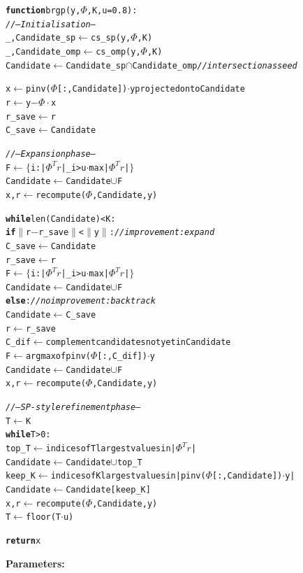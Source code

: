 \documentclass[12pt,a4paper]{article}
\begin{document}
\begin{alltt}
\textbf{function} brgp(y, \(\Phi\), K, u=0.8):
    \textit{// --- Initialisation ---}
    \_, Candidate\_sp  \(\leftarrow\) cs\_sp(y, \(\Phi\), K)
    \_, Candidate\_omp \(\leftarrow\) cs\_omp(y, \(\Phi\), K)
    Candidate         \(\leftarrow\) Candidate\_sp \(\cap\) Candidate\_omp  \textit{// intersection as seed}

    x      \(\leftarrow\) pinv(\(\Phi\)[:, Candidate]) \(\cdot\) y projected onto Candidate
    r      \(\leftarrow\) y \(-\) \(\Phi \cdot\) x
    r\_save \(\leftarrow\) r
    C\_save \(\leftarrow\) Candidate

    \textit{// --- Expansion phase ---}
    F         \(\leftarrow\) \(\{\) i : |\(\Phi^T r\)|\_i > u \(\cdot\) max|\(\Phi^T r\)| \(\}\)
    Candidate \(\leftarrow\) Candidate \(\cup\) F
    x, r      \(\leftarrow\) recompute(\(\Phi\), Candidate, y)

    \textbf{while} len(Candidate) < K:
        \textbf{if} \(\|\)r \(-\) r\_save\(\|\) < \(\|\)y\(\|\):           \textit{// improvement: expand}
            C\_save    \(\leftarrow\) Candidate
            r\_save    \(\leftarrow\) r
            F         \(\leftarrow\) \(\{\) i : |\(\Phi^T r\)|\_i > u \(\cdot\) max|\(\Phi^T r\)| \(\}\)
            Candidate \(\leftarrow\) Candidate \(\cup\) F
        \textbf{else}:                              \textit{// no improvement: backtrack}
            Candidate \(\leftarrow\) C\_save
            r         \(\leftarrow\) r\_save
            C\_dif     \(\leftarrow\) complement candidates not yet in Candidate
            F         \(\leftarrow\) argmax of pinv(\(\Phi\)[:, C\_dif]) \(\cdot\) y
            Candidate \(\leftarrow\) Candidate \(\cup\) F
        x, r \(\leftarrow\) recompute(\(\Phi\), Candidate, y)

    \textit{// --- SP-style refinement phase ---}
    T \(\leftarrow\) K
    \textbf{while} T > 0:
        top\_T     \(\leftarrow\) indices of T largest values in |\(\Phi^T r\)|
        Candidate \(\leftarrow\) Candidate \(\cup\) top\_T
        keep\_K    \(\leftarrow\) indices of K largest values in |pinv(\(\Phi\)[:, Candidate]) \(\cdot\) y|
        Candidate \(\leftarrow\) Candidate[keep\_K]
        x, r      \(\leftarrow\) recompute(\(\Phi\), Candidate, y)
        T         \(\leftarrow\) floor(T \(\cdot\) u)

    \textbf{return} x
\end{alltt}

\textbf{Parameters:}
\end{document}

